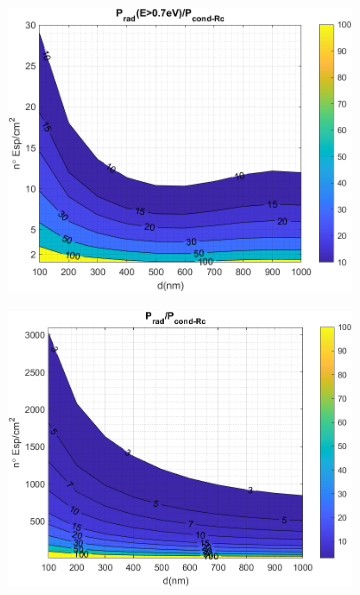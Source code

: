 \begin{figure}[H]
\begin{subfigure}[b]{0.49\textwidth}
		\caption{ }
		\label{fig:rel_SiCSiO2Ge_Rc}
	\end{subfigure}
	\hfill
	\begin{subfigure}[b]{0.49\textwidth}
		\centering
		\includegraphics[width=1.00\textwidth]{figuras/Resultados/RelacionCondRad/SiC_Rc.png}
		\caption{ }
		\label{fig:rel_SiCSiO2Ge_full}
	\end{subfigure}
	\hfill
	\begin{subfigure}[b]{0.49\textwidth}
		\centering
		\includegraphics[width=1.00\textwidth]{figuras/Resultados/RelacionCondRad/SiC_Ge_Rc_full.png}
		\caption{ }
		\label{fig:rel_SiCSiO2Ge_Rc_full}
	\end{subfigure}
	\caption{ }
	\label{fig:relation_SiCSiO2Ge}
\end{figure}

